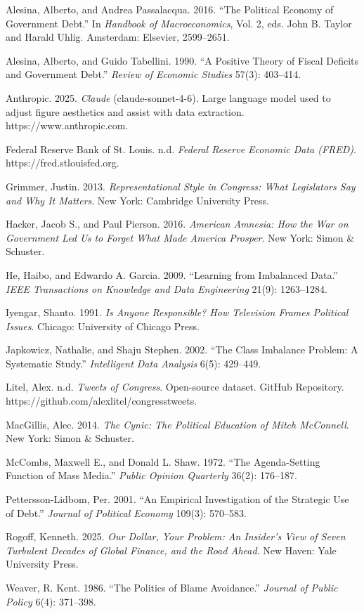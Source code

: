 \documentclass[
  12pt,
]{article}
\begin{document}
\begin{singlespace}
\setlength{\parindent}{-1.5em}
\setlength{\leftskip}{1.5em}
\setlength{\parskip}{8pt}

Alesina, Alberto, and Andrea Passalacqua. 2016. ``The Political Economy of Government Debt.'' In \textit{Handbook of Macroeconomics}, Vol. 2, eds. John B. Taylor and Harald Uhlig. Amsterdam: Elsevier, 2599--2651.

Alesina, Alberto, and Guido Tabellini. 1990. ``A Positive Theory of Fiscal Deficits and Government Debt.'' \textit{Review of Economic Studies} 57(3): 403--414.

Anthropic. 2025. \textit{Claude} (claude-sonnet-4-6). Large language model used to adjust figure aesthetics and assist with data extraction. https://www.anthropic.com.

Federal Reserve Bank of St. Louis. n.d. \textit{Federal Reserve Economic Data (FRED)}. https://fred.stlouisfed.org.

Grimmer, Justin. 2013. \textit{Representational Style in Congress: What Legislators Say and Why It Matters}. New York: Cambridge University Press.

Hacker, Jacob S., and Paul Pierson. 2016. \textit{American Amnesia: How the War on Government Led Us to Forget What Made America Prosper}. New York: Simon \& Schuster.

He, Haibo, and Edwardo A. Garcia. 2009. ``Learning from Imbalanced Data.'' \textit{IEEE Transactions on Knowledge and Data Engineering} 21(9): 1263--1284.

Iyengar, Shanto. 1991. \textit{Is Anyone Responsible? How Television Frames Political Issues}. Chicago: University of Chicago Press.

Japkowicz, Nathalie, and Shaju Stephen. 2002. ``The Class Imbalance Problem: A Systematic Study.'' \textit{Intelligent Data Analysis} 6(5): 429--449.

Litel, Alex. n.d. \textit{Tweets of Congress}. Open-source dataset. GitHub Repository. https://github.com/alexlitel/congresstweets.

MacGillis, Alec. 2014. \textit{The Cynic: The Political Education of Mitch McConnell}. New York: Simon \& Schuster.

McCombs, Maxwell E., and Donald L. Shaw. 1972. ``The Agenda-Setting Function of Mass Media.'' \textit{Public Opinion Quarterly} 36(2): 176--187.

Pettersson-Lidbom, Per. 2001. ``An Empirical Investigation of the Strategic Use of Debt.'' \textit{Journal of Political Economy} 109(3): 570--583.

Rogoff, Kenneth. 2025. \textit{Our Dollar, Your Problem: An Insider's View of Seven Turbulent Decades of Global Finance, and the Road Ahead}. New Haven: Yale University Press.

Weaver, R. Kent. 1986. ``The Politics of Blame Avoidance.'' \textit{Journal of Public Policy} 6(4): 371--398.

\end{singlespace}
\end{document}
